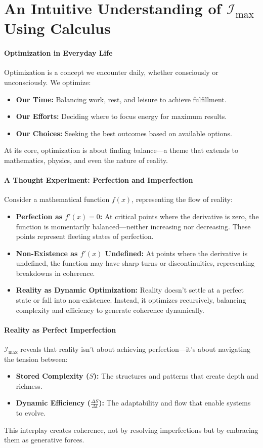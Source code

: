 \documentclass[12pt]{article}
\begin{document}
\section{An Intuitive Understanding of \(\mathcal{I}_{\text{max}}\) Using Calculus}

\paragraph{Optimization in Everyday Life}
Optimization is a concept we encounter daily, whether consciously or unconsciously. We optimize:
\begin{itemize}
    \item \textbf{Our Time:} Balancing work, rest, and leisure to achieve fulfillment.
    \item \textbf{Our Efforts:} Deciding where to focus energy for maximum results.
    \item \textbf{Our Choices:} Seeking the best outcomes based on available options.
\end{itemize}
At its core, optimization is about finding balance—a theme that extends to mathematics, physics, and even the nature of reality.

\paragraph{A Thought Experiment: Perfection and Imperfection}
Consider a mathematical function \( f(x) \), representing the flow of reality:
\begin{itemize}
    \item \textbf{Perfection as \( f'(x) = 0 \):}  
    At critical points where the derivative is zero, the function is momentarily balanced—neither increasing nor decreasing. These points represent fleeting states of perfection.
    \item \textbf{Non-Existence as \( f'(x) \) Undefined:}  
    At points where the derivative is undefined, the function may have sharp turns or discontinuities, representing breakdowns in coherence.
    \item \textbf{Reality as Dynamic Optimization:}  
    Reality doesn’t settle at a perfect state or fall into non-existence. Instead, it optimizes recursively, balancing complexity and efficiency to generate coherence dynamically.
\end{itemize}

\paragraph{Reality as Perfect Imperfection}
\(\mathcal{I}_{\text{max}}\) reveals that reality isn’t about achieving perfection—it’s about navigating the tension between:
\begin{itemize}
    \item \textbf{Stored Complexity (\(S\)):}  
    The structures and patterns that create depth and richness.
    \item \textbf{Dynamic Efficiency (\(\frac{\Delta S}{\Delta t}\)):}  
    The adaptability and flow that enable systems to evolve.
\end{itemize}
This interplay creates coherence, not by resolving imperfections but by embracing them as generative forces.
\end{document}
